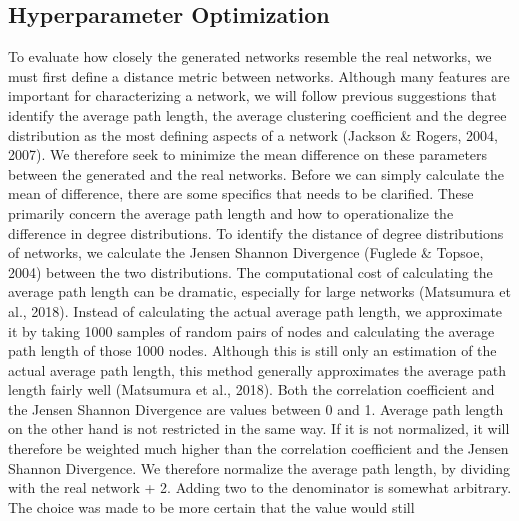 \documentclass{article}
\begin{document}
\subsection{Hyperparameter Optimization}
To evaluate how closely the generated networks resemble the real networks, we must first define a distance metric between networks. Although many features are important for characterizing a network, we will follow previous suggestions that identify the average path length, the average clustering coefficient and the degree distribution as the most defining aspects of a network (Jackson \& Rogers, 2004, 2007). We therefore seek to minimize the mean difference on these parameters between the generated and the real networks. 
Before we can simply calculate the mean of difference, there are some specifics that needs to be clarified. These primarily concern the average path length and how to operationalize the difference in degree distributions. 
To identify the distance of degree distributions of networks, we calculate the Jensen Shannon Divergence (Fuglede \& Topsoe, 2004) between the two distributions. 
The computational cost of calculating the average path length can be dramatic, especially for large networks (Matsumura et al., 2018). Instead of calculating the actual average path length, we approximate it by taking 1000 samples of random pairs of nodes and calculating the average path length of those 1000 nodes. Although this is still only an estimation of the actual average path length, this method generally approximates the average path length fairly well (Matsumura et al., 2018).
Both the correlation coefficient and the Jensen Shannon Divergence are values between 0 and 1. Average path length on the other hand is not restricted in the same way. If it is not normalized, it will therefore be weighted much higher than the correlation coefficient and the Jensen Shannon Divergence. We therefore normalize the average path length, by dividing with the real network + 2. Adding two to the denominator is somewhat arbitrary. The choice was made to be more certain that the value would still 
\end{document}
